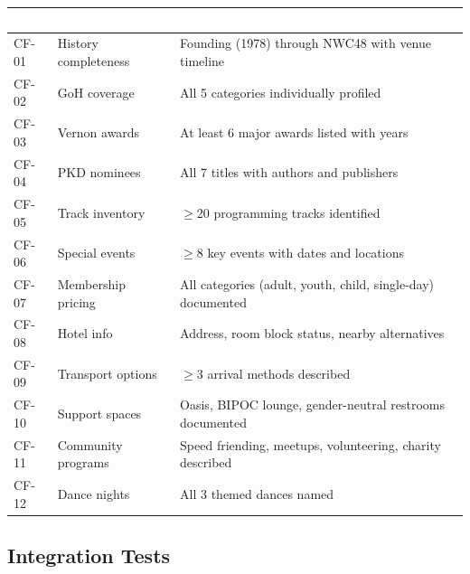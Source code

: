 \documentclass[11pt,letterpaper]{article}
\newcommand{\tableheader}[1]{\textbf{\sffamily\textcolor{white}{#1}}}
\begin{document}
\begin{center}
\begin{tabularx}{\textwidth}{C{1.2cm}L{3cm}X}
\toprule
{}
\tableheader{ID} & \tableheader{Verifies} & \tableheader{Expected Behavior} \\
\midrule
CF-01 & History completeness & Founding (1978) through NWC48 with venue timeline \\
CF-02 & GoH coverage & All 5 categories individually profiled \\
CF-03 & Vernon awards & At least 6 major awards listed with years \\
CF-04 & PKD nominees & All 7 titles with authors and publishers \\
CF-05 & Track inventory & $\geq$20 programming tracks identified \\
CF-06 & Special events & $\geq$8 key events with dates and locations \\
CF-07 & Membership pricing & All categories (adult, youth, child, single-day) documented \\
CF-08 & Hotel info & Address, room block status, nearby alternatives \\
CF-09 & Transport options & $\geq$3 arrival methods described \\
CF-10 & Support spaces & Oasis, BIPOC lounge, gender-neutral restrooms documented \\
CF-11 & Community programs & Speed friending, meetups, volunteering, charity described \\
CF-12 & Dance nights & All 3 themed dances named \\
\bottomrule
\end{tabularx}
\end{center}

\subsection{Integration Tests}
\end{document}

